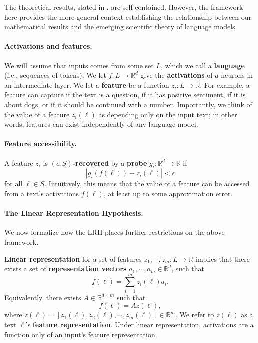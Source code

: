 \documentclass[11pt]{article}
\newcommand{\RR}{\mathbb{R}}
\begin{document}
The theoretical results, stated in , are self-contained. However, the framework here provides the more general context establishing the relationship between our mathematical results and the emerging scientific theory of language models.

\paragraph{Activations and features.} We will assume that inputs comes from some set $L$, which we call a \textbf{language} (i.e., sequences of tokens). We let $f:L\rightarrow \RR^d$ give the \textbf{activations} of $d$ neurons in an intermediate layer. We let a \textbf{feature} be a function $z_i:L\rightarrow \RR$. For example, a feature can capture if the text is a question, if it has positive sentiment, if it is about dogs, or if it should be continued with a number. Importantly, we think of the value of a feature $z_i(\ell)$ as depending only on the input text; in other words, features can exist independently of any language model.

\paragraph{Feature accessibility.} A feature $z_i$ is \textbf{$(\epsilon, S)$-recovered} by a \textbf{probe} $g_i:\RR^d\rightarrow \RR$ if
\begin{equation}
    |g_i(f(\ell)) - z_i(\ell)| < \epsilon
\end{equation}
for all $\ell \in S.$ Intuitively, this means that the value of a feature can be accessed from a text's activations $f(\ell)$, at least up to some approximation error.

\paragraph{The Linear Representation Hypothesis.} We now formalize how the LRH places further restrictions on the above framework.

\textbf{Linear representation} for a set of features $z_1,\cdots,z_m:L\rightarrow \RR$ implies that there exists a set of \textbf{representation vectors} $a_1,\cdots,a_m\in \RR^d$, such that
\begin{equation}
    f(\ell) = \sum_{i=1}^m z_i(\ell)a_i.
\end{equation}
Equivalently, there exists $A\in \RR^{d\times m}$ such that
\begin{equation}
    f(\ell) = Az(\ell),
\end{equation}
where $z(\ell)=[z_1(\ell),z_2(\ell),\cdots,z_m(\ell)]\in \RR^m.$ We refer to $z(\ell)$ as a text $\ell$'s \textbf{feature representation}. Under linear representation, activations are a function only of an input's feature representation.
\end{document}
